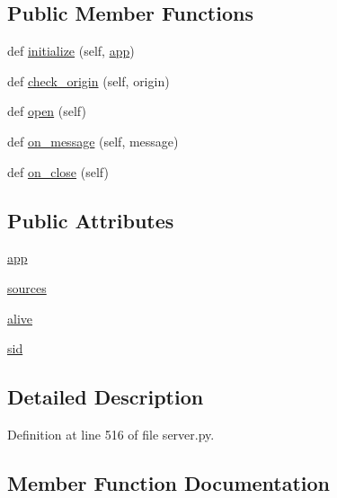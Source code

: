 \subsection*{Public Member Functions}
\begin{DoxyCompactItemize}
\item 
def \hyperlink{classserver_1_1TaskSocketHandler_a4c5c0fc90924bbdeaf99acb15310e206}{initialize} (self, \hyperlink{classserver_1_1TaskSocketHandler_a85a1a3e1871a02e4024bfbefdfdacdb8}{app})
\item 
def \hyperlink{classserver_1_1TaskSocketHandler_af8b1c9a1e3118f52d65a581fc1179781}{check\+\_\+origin} (self, origin)
\item 
def \hyperlink{classserver_1_1TaskSocketHandler_a815e99396d5eae54037b0dea06280f54}{open} (self)
\item 
def \hyperlink{classserver_1_1TaskSocketHandler_ab117ce39dbeced9ce1092b3b3a56fe5c}{on\+\_\+message} (self, message)
\item 
def \hyperlink{classserver_1_1TaskSocketHandler_ad4beb88c347e0edec2913d28317e52e1}{on\+\_\+close} (self)
\end{DoxyCompactItemize}
\subsection*{Public Attributes}
\begin{DoxyCompactItemize}
\item 
\hyperlink{classserver_1_1TaskSocketHandler_a85a1a3e1871a02e4024bfbefdfdacdb8}{app}
\item 
\hyperlink{classserver_1_1TaskSocketHandler_a8edc3b231710027221b9251c18eaab60}{sources}
\item 
\hyperlink{classserver_1_1TaskSocketHandler_ac3812d20429f441bb67a5b122eac1448}{alive}
\item 
\hyperlink{classserver_1_1TaskSocketHandler_adf9dedcdbc523b8f07b61c155a6fc7d6}{sid}
\end{DoxyCompactItemize}


\subsection{Detailed Description}


Definition at line 516 of file server.\+py.



\subsection{Member Function Documentation}
\mbox{\label{classserver_1_1TaskSocketHandler_af8b1c9a1e3118f52d65a581fc1179781}} 
